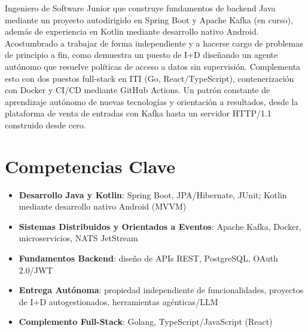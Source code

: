 \documentclass[11pt,a4paper,sans]{moderncv}
\begin{document}
\makecvtitle


\vspace{6pt}
\small{Ingeniero de Software Junior que construye fundamentos de backend Java mediante un proyecto autodirigido en Spring Boot y Apache Kafka (en curso), además de experiencia en Kotlin mediante desarrollo nativo Android. Acostumbrado a trabajar de forma independiente y a hacerse cargo de problemas de principio a fin, como demuestra un puesto de I+D diseñando un agente autónomo que resuelve políticas de acceso a datos sin supervisión. Complementa esto con dos puestos full-stack en ITI (Go, React/TypeScript), contenerización con Docker y CI/CD mediante GitHub Actions. Un patrón constante de aprendizaje autónomo de nuevas tecnologías y orientación a resultados, desde la plataforma de venta de entradas con Kafka hasta un servidor HTTP/1.1 construido desde cero.}


\section{Competencias Clave}
\vspace{1pt}
\begin{itemize}

\item \textbf{Desarrollo Java y Kotlin}: Spring Boot, JPA/Hibernate, JUnit; Kotlin mediante desarrollo nativo Android (MVVM)

\item \textbf{Sistemas Distribuidos y Orientados a Eventos}: Apache Kafka, Docker, microservicios, NATS JetStream

\item \textbf{Fundamentos Backend}: diseño de APIs REST, PostgreSQL, OAuth 2.0/JWT

\item \textbf{Entrega Autónoma}: propiedad independiente de funcionalidades, proyectos de I+D autogestionados, herramientas agénticas/LLM

\item \textbf{Complemento Full-Stack}: Golang, TypeScript/JavaScript (React)

\end{itemize}
\end{document}
